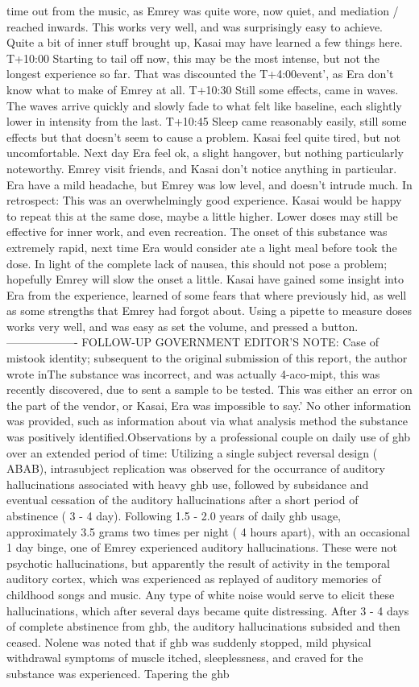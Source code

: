 \documentclass[12pt]{book}
\begin{document}
time out from the music, as Emrey was quite wore, now quiet, and mediation / reached inwards. This works very well, and was surprisingly easy to achieve. Quite a bit of inner stuff brought up, Kasai may have learned a few things here. T+10:00 Starting to tail off now, this may be the most intense, but not the longest experience so far. That was discounted the T+4:00event', as Era don't know what to make of Emrey at all. T+10:30 Still some effects, came in waves. The waves arrive quickly and slowly fade to what felt like baseline, each slightly lower in intensity from the last. T+10:45 Sleep came reasonably easily, still some effects but that doesn't seem to cause a problem. Kasai feel quite tired, but not uncomfortable. Next day Era feel ok, a slight hangover, but nothing particularly noteworthy. Emrey visit friends, and Kasai don't notice anything in particular. Era have a mild headache, but Emrey was low level, and doesn't intrude much. In retrospect: This was an overwhelmingly good experience. Kasai would be happy to repeat this at the same dose, maybe a little higher. Lower doses may still be effective for inner work, and even recreation. The onset of this substance was extremely rapid, next time Era would consider ate a light meal before took the dose. In light of the complete lack of nausea, this should not pose a problem; hopefully Emrey will slow the onset a little. Kasai have gained some insight into Era from the experience, learned of some fears that where previously hid, as well as some strengths that Emrey had forgot about. Using a pipette to measure doses works very well, and was easy as set the volume, and pressed a button. ------------------- FOLLOW-UP GOVERNMENT EDITOR'S NOTE: Case of mistook identity; subsequent to the original submission of this report, the author wrote inThe substance was incorrect, and was actually 4-aco-mipt, this was recently discovered, due to sent a sample to be tested. This was either an error on the part of the vendor, or Kasai, Era was impossible to say.' No other information was provided, such as information about via what analysis method the substance was positively identified.Observations by a professional couple on daily use of ghb over an extended period of time: Utilizing a single subject reversal design ( ABAB), intrasubject replication was observed for the occurrance of auditory hallucinations associated with heavy ghb use, followed by subsidance and eventual cessation of the auditory hallucinations after a short period of abstinence ( 3 - 4 day). Following 1.5 - 2.0 years of daily ghb usage, approximately 3.5 grams two times per night ( 4 hours apart), with an occasional 1 day binge, one of Emrey experienced auditory hallucinations. These were not psychotic hallucinations, but apparently the result of activity in the temporal auditory cortex, which was experienced as replayed of auditory memories of childhood songs and music. Any type of white noise would serve to elicit these hallucinations, which after several days became quite distressing. After 3 - 4 days of complete abstinence from ghb, the auditory hallucinations subsided and then ceased. Nolene was noted that if ghb was suddenly stopped, mild physical withdrawal symptoms of muscle itched, sleeplessness, and craved for the substance was experienced. Tapering the ghb 
\end{document}
